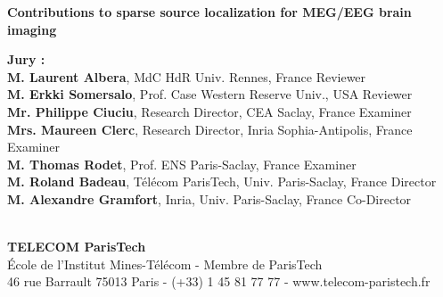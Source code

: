 \documentclass[12pt,a4paper,english]{MastersDoctoralThesis}
\begin{document}
\begin{center}
%
%
%
\vspace{1.cm}%
%
%
%
\begin{spacing}{3.0}
\textcolor[RGB]{191,18,56}{
\noindent
{\Huge{\bf Contributions to sparse source localization for MEG/EEG brain imaging}}\\
}
\end{spacing}
%
%
\vspace{2.cm}%
%
%
%
\end{center}
%
%
%
\vspace{-1.2cm}
%
%
%
\flushleft
\hspace{-1.7cm}
\begin{minipage}{1.05\textwidth}	%
{\bf Jury :}\vspace{0.2cm}\\
{\bf M. Laurent Albera}, {\small MdC HdR Univ. Rennes, France}
\hfill Reviewer\\
{\bf M. Erkki Somersalo}, {\small Prof. Case Western Reserve Univ., USA}
\hfill Reviewer\\
{\bf Mr. Philippe Ciuciu}, {\small Research Director, CEA Saclay, France}
\hfill Examiner\\
{\bf Mrs. Maureen Clerc}, {\small Research Director, Inria Sophia-Antipolis, France}
\hfill Examiner\\
{\bf M. Thomas Rodet}, {\small Prof. ENS Paris-Saclay, France}
\hfill Examiner\\
{\bf M. Roland Badeau}, {\small T\'el\'ecom ParisTech, Univ. Paris-Saclay, France}
\hfill Director\\
{\bf M. Alexandre Gramfort}, {\small Inria, Univ. Paris-Saclay, France}
\hfill Co-Director\\
\end{minipage}\\
%
%
%
\vspace{.8cm}
%
%
%
\centering
{\bf TELECOM ParisTech}\\
{\small École de l'Institut Mines-Télécom - Membre de ParisTech}\\
{\tiny 46 rue Barrault 75013 Paris - (+33) 1 45 81 77 77 - www.telecom-paristech.fr}
%
%
%
\newpage
\end{document}
